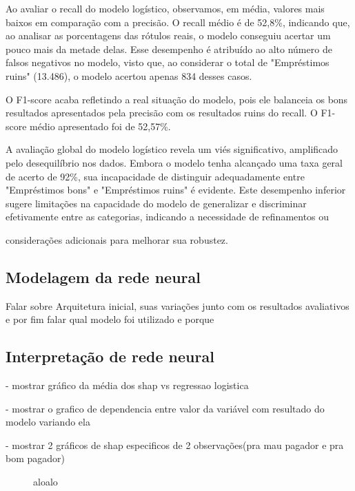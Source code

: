 Ao avaliar o recall do modelo logístico, observamos, em média,
valores mais baixos em comparação com a precisão. O recall médio é de 52,8\%, 
indicando que, ao analisar as porcentagens das rótulos reais, o modelo conseguiu 
acertar um pouco mais da metade delas. Esse desempenho é atribuído ao alto número 
de falsos negativos no modelo, visto que, ao considerar o total de "Empréstimos ruins" (13.486),
 o modelo acertou apenas 834 desses casos.

O F1-score acaba refletindo a real situação do modelo, pois ele balanceia os bons resultados
apresentados pela precisão com os resultados ruins do recall. O F1-score médio apresentado foi
de 52,57\%.

A avaliação global do modelo logístico revela um viés significativo, amplificado pelo desequilíbrio nos dados.
Embora o modelo tenha alcançado uma taxa geral de acerto de 92\%, sua incapacidade de distinguir
adequadamente entre "Empréstimos bons" e "Empréstimos ruins" é evidente. 
Este desempenho inferior sugere limitações na capacidade do modelo de generalizar e
discriminar efetivamente entre as categorias, indicando a necessidade de refinamentos ou 

considerações adicionais para melhorar sua robustez.


\subsection{Modelagem da rede neural}
Falar sobre Arquitetura inicial, suas variações junto com os 
resultados avaliativos e por fim falar qual modelo foi utilizado
e porque

\subsection*{Interpretação de rede neural}

- mostrar gráfico da média dos shap vs regressao logistica

- mostrar o grafico de dependencia entre valor da variável com resultado do modelo variando ela

- mostrar 2 gráficos de shap especificos de 2 observações(pra mau pagador e pra bom pagador)
\begin{figure}[H]
  \centering
  \vspace{.5cm}
  \vspace{.5cm}
  
  \label{fig:enter-label}
  \caption{aloalo}
\end{figure}

